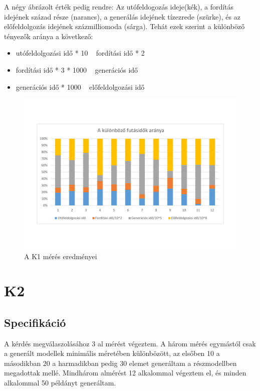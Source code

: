 A négy ábrázolt érték pedig rendre: Az utófeldogozás ideje(kék), a fordítás idejének század része (narancs), a generálás idejének tízezrede (szürke), és az előfeldolgozás idejének százmilliomoda (sárga). Tehát ezek szerint a különböző tényezők aránya a következő:
\begin{itemize}
	\item utófeldolgozási idő * 10 ~ fordítási idő * 2
	\item fordítási idő * 3 * 1000 ~ generációs idő
	\item generációs idő *  1000 ~ előfeldolgozási idő
\end{itemize}

\begin{figure}
	\centering
	\includegraphics[width=1\textwidth]{figures/aránygrafikontáblázathelyett}
	\caption{A K1 mérés eredményei}
	\label{fig:grafikon}
\end{figure}



\section{K2}
\subsection{Specifikáció}
A kérdés megválaszolásához 3 al mérést végeztem. A három mérés egymástól csak a generált modellek minimális méretében különbözött, az elsőben 10 a másodikban 20 a harmadikban pedig 30 elemet generáltam a részmodellben megadottak mellé. 
Mindhárom almérést 12 alkalommal végeztem el, és minden alkalommal 50 példányt generáltam. 

